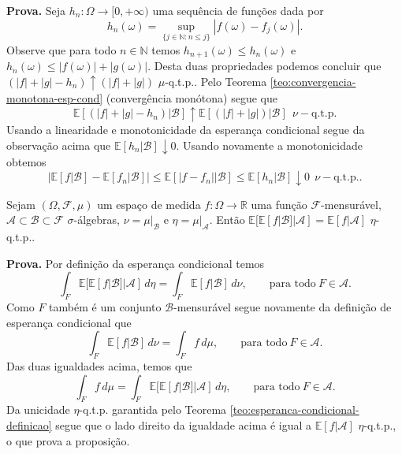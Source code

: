 \textbf{Prova.} Seja $h_n:\Omega\to\mathbb[0,+\infty)$ uma sequência de funções dada por 
$$
h_n(\omega)=\displaystyle\sup_{\{j\in\mathbb{N}:n\leq j\}}|f(\omega)-f_j(\omega)|.
$$
Observe que para todo $n\in\mathbb{N}$ temos $h_{n+1}(\omega)\leq h_{n}(\omega)$ e $h_n(\omega)\leq |f(\omega)|+|g(\omega)|$. Desta duas 
propriedades podemos concluir que $(|f|+|g|-h_n)\uparrow (|f|+|g|)$ $\mu$-q.t.p.. 
Pelo Teorema \ref{teo:convergencia-monotona-esp-cond} (convergência monótona) segue que
$$
\mathbb{E}[(|f|+|g|-h_n)|\mathcal{B}]\uparrow \mathbb{E}[(|f|+|g|)|\mathcal{B}]\ \  \nu-\text{q.t.p.}
$$
Usando a linearidade e monotonicidade da esperança condicional segue da observação acima que $\mathbb{E}[h_n|\mathcal{B}]\downarrow 0$.
Usando novamente a monotonicidade obtemos 
$$
\big|\mathbb{E}[f|\mathcal{B}]-\mathbb{E}[f_n|\mathcal{B}]  \big|
\leq
\mathbb{E}[|f-f_n||\mathcal{B}]
\leq \mathbb{E}[h_n|\mathcal{B}]\downarrow 0 \ \ \nu-\text{q.t.p.}.
$$
\bigskip
\begin{proposicao}
Sejam $(\Omega,\mathcal{F},\mu)$ um espaço de medida $f:\Omega\to\mathbb{R}$ uma 
função $\mathcal{F}$-mensurável, $\mathscr{A}\subset\mathcal{B}\subset\mathcal{F}$ $\sigma$-álgebras,
$\nu=\mu|_{\mathcal{B}}$ e $\eta=\mu|_{\mathscr{A}}$.
Então $\mathbb{E}[\mathbb{E}[f|\mathcal{B}]|\mathscr{A}]=\mathbb{E}[f|\mathscr{A}]$ $\eta$-q.t.p..
\end{proposicao}
\textbf{Prova.} Por definição da esperança condicional temos 
$$
\int_{F} \mathbb{E}[\mathbb{E}[f|\mathcal{B}]|\mathscr{A}]\, d\eta
=
\int_{F} \mathbb{E}[f|\mathcal{B}]\, d\nu,
\qquad\text{para todo}\ F\in\mathscr{A}.
$$
Como $F$ também é um conjunto $\mathcal{B}$-mensurável segue novamente da definição de esperança condicional que 
$$
\int_{F} \mathbb{E}[f|\mathcal{B}]\, d\nu
=
\int_{F} f\, d\mu,
\qquad\text{para todo}\ F\in\mathscr{A}.
$$
Das duas igualdades acima, temos que 
$$
\int_{F} f\, d\mu =
\int_{F} \mathbb{E}[\mathbb{E}[f|\mathcal{B}]|\mathscr{A}]\, d\eta,
\qquad\text{para todo}\ F\in\mathscr{A}.
$$
Da unicidade $\eta$-q.t.p. garantida pelo Teorema \ref{teo:esperanca-condicional-definicao} segue que 
o lado direito da igualdade acima é igual a $\mathbb{E}[f|\mathscr{A}]$ $\eta$-q.t.p., 
o que prova a proposição.
\bigskip